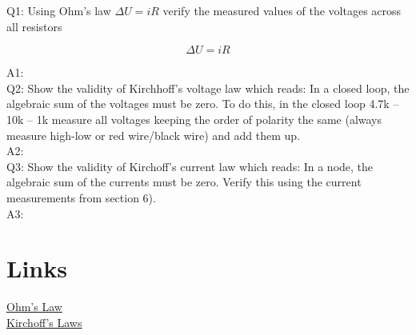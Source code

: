 \documentclass[11pt,letterpaper]{article}
\begin{document}
Q1: Using Ohm’s law $\Delta U = i R$ verify the measured values of the voltages across all resistors

\begin{equation} \label{Eqn:LabIntroduction1}
\Delta U = i R
\end{equation}

A1:\\


Q2: Show the validity of Kirchhoff’s voltage law which reads: In a closed loop, the algebraic sum of the voltages must be zero. To do this, in the closed loop 4.7k – 10k – 1k measure all voltages keeping the order of polarity the same (always measure high-low or red wire/black wire) and add them up.\\

A2:\\


Q3: Show the validity of Kirchoff’s current law which reads: In a node, the algebraic sum of the currents must be zero. Verify this using the current measurements from section 6).\\

A3:\\


\section{Links}

\href{http://en.wikipedia.org/wiki/Ohm%27s_law}{Ohm's Law}\\
\href{http://en.wikipedia.org/wiki/Kirchhoff%27s_circuit_laws}{Kirchoff's Laws}
\end{document}
